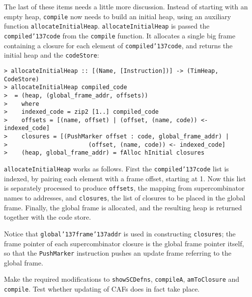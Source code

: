 The last of these items needs a little more discussion.  Instead of
starting with an empty heap, \mbox{\tt compile} now needs to build an initial
heap, using an auxiliary function \mbox{\tt allocateInitialHeap}.
\mbox{\tt allocateInitialHeap} is passed the \mbox{\tt compiled{\char'137}code} from the \mbox{\tt compile}
function.  It allocates a single big frame containing a closure for
each element of \mbox{\tt compiled{\char'137}code}, and returns the initial heap and the
\mbox{\tt codeStore}:
\begin{verbatim}
> allocateInitialHeap :: [(Name, [Instruction])] -> (TimHeap, CodeStore)
> allocateInitialHeap compiled_code
>  = (heap, (global_frame_addr, offsets))
>    where
>    indexed_code = zip2 [1..] compiled_code
>    offsets = [(name, offset) | (offset, (name, code)) <- indexed_code]
>    closures = [(PushMarker offset : code, global_frame_addr) |
>                       (offset, (name, code)) <- indexed_code]
>    (heap, global_frame_addr) = fAlloc hInitial closures
\end{verbatim}
%
%
\mbox{\tt allocateInitialHeap} works as follows.  First the \mbox{\tt compiled{\char'137}code}
list is indexed, by pairing each element with a frame offset, starting
at 1.  Now this list is separately processed to produce \mbox{\tt offsets}, the
mapping from supercombinator names to addresses, and \mbox{\tt closures}, the
list of closures to be placed in the global frame.  Finally, the
global frame is allocated, and the resulting heap is returned together
with the code store.

Notice that \mbox{\tt global{\char'137}frame{\char'137}addr} is used in constructing \mbox{\tt closures};
the frame pointer of each supercombinator closure is the global frame
pointer itself, so that the \mbox{\tt PushMarker} instruction pushes an update
frame referring to the global frame.

\begin{exercise}
Make the required modifications to \mbox{\tt showSCDefns},
\mbox{\tt compileA}, \mbox{\tt amToClosure} and \mbox{\tt compile}.
Test whether updating of CAFs does in fact take place.
\end{exercise}


